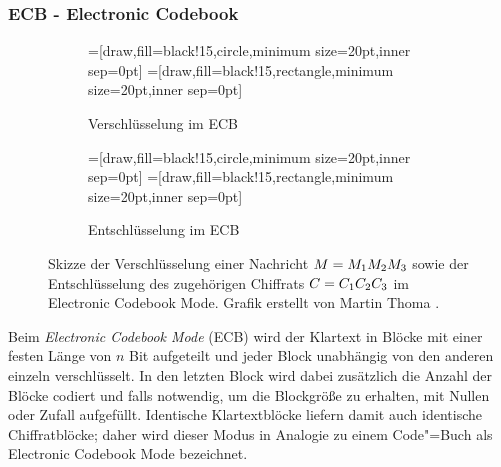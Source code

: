 \subsubsection{ECB - Electronic Codebook}
\begin{figure}[h]
	\centering
	\begin{subfigure}[h]{.45\textwidth}
		\centering
		=[draw,fill=black!15,circle,minimum size=20pt,inner sep=0pt]
		=[draw,fill=black!15,rectangle,minimum size=20pt,inner sep=0pt]
		\caption{Verschlüsselung im ECB}
	\end{subfigure}
	\hfill
	\begin{subfigure}[h]{.45\textwidth}
		\centering
		=[draw,fill=black!15,circle,minimum size=20pt,inner sep=0pt]
		=[draw,fill=black!15,rectangle,minimum size=20pt,inner sep=0pt]
		\caption{Entschlüsselung im ECB}
	\end{subfigure}
	\caption{Skizze der Verschlüsselung einer Nachricht $M = M_1 M_2 M_3$ sowie der Entschlüsselung des zugehörigen Chiffrats $C = C_1 C_2 C_3$ im
	Electronic Codebook Mode. Grafik erstellt von Martin Thoma \cite{Thoma2013}.}
\end{figure}

Beim \emph{Electronic Codebook Mode} (ECB) wird der Klartext in Blöcke mit einer festen Länge von $n$ Bit aufgeteilt und jeder Block unabhängig von den anderen einzeln verschlüsselt. In den
letzten Block wird dabei zusätzlich die Anzahl der Blöcke codiert und falls notwendig, um die Blockgröße zu erhalten, mit Nullen oder Zufall aufgefüllt.
Identische Klartextblöcke liefern damit auch identische Chiffratblöcke; daher wird dieser Modus in Analogie zu einem Code"=Buch als Electronic Codebook Mode bezeichnet.

